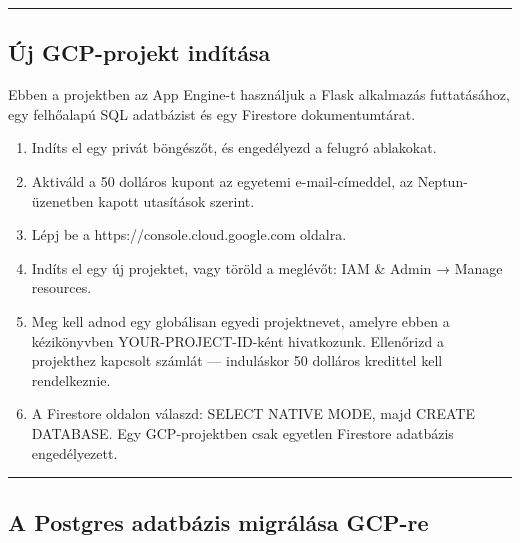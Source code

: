 \documentclass[
  magyar,
]{article}
\providecommand{\tightlist}{%
  \setlength{\itemsep}{0pt}\setlength{\parskip}{0pt}}
\begin{document}
\begin{center}\rule{0.5\linewidth}{0.5pt}\end{center}

\subsection{Új GCP-projekt
indítása}\label{uxfaj-gcp-projekt-induxedtuxe1sa}

Ebben a projektben az App Engine-t használjuk a Flask alkalmazás
futtatásához, egy felhőalapú SQL adatbázist és egy Firestore
dokumentumtárat.

\begin{enumerate}
\def\labelenumi{\arabic{enumi}.}
\tightlist
\item
  Indíts el egy privát böngészőt, és engedélyezd a felugró ablakokat.
\item
  Aktiváld a 50 dolláros kupont az egyetemi e-mail-címeddel, az
  Neptun-üzenetben kapott utasítások szerint.
\item
  Lépj be a https://console.cloud.google.com oldalra.
\item
  Indíts el egy új projektet, vagy töröld a meglévőt: IAM \& Admin →
  Manage resources.
\item
  Meg kell adnod egy globálisan egyedi projektnevet, amelyre ebben a
  kézikönyvben YOUR-PROJECT-ID-ként hivatkozunk. Ellenőrizd a projekthez
  kapcsolt számlát --- induláskor 50 dolláros kredittel kell
  rendelkeznie.
\item
  A Firestore oldalon válaszd: SELECT NATIVE MODE, majd CREATE DATABASE.
  Egy GCP-projektben csak egyetlen Firestore adatbázis engedélyezett.
\end{enumerate}

\begin{center}\rule{0.5\linewidth}{0.5pt}\end{center}

\subsection{A Postgres adatbázis migrálása
GCP-re}\label{a-postgres-adatbuxe1zis-migruxe1luxe1sa-gcp-re}
\end{document}
